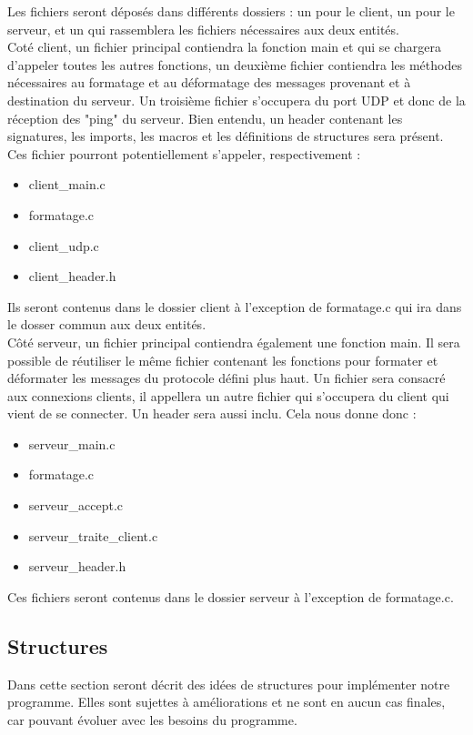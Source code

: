 \documentclass[12pt]{article}
\begin{document}
Les fichiers seront déposés dans différents dossiers : un pour le client, un pour le serveur, et un qui rassemblera les fichiers nécessaires aux deux entités.\\

Coté client, un fichier principal contiendra la fonction main et qui se chargera d'appeler toutes les autres fonctions, un deuxième fichier contiendra  les méthodes nécessaires au formatage et au déformatage des messages provenant et à destination du serveur. Un troisième fichier s'occupera du port UDP et donc de la réception des "ping" du serveur. Bien entendu, un header contenant les signatures, les imports, les macros et les définitions de structures sera présent.\\
Ces fichier pourront potentiellement s'appeler, respectivement :
\begin{itemize}
\item client\_main.c
\item formatage.c
\item client\_udp.c
\item client\_header.h
\end{itemize}
Ils seront contenus dans le dossier client à l'exception de formatage.c qui ira dans le dosser commun aux deux entités.\\

Côté serveur, un fichier principal contiendra également une fonction main. Il sera possible de réutiliser le même fichier contenant les fonctions pour formater et déformater les messages du protocole défini plus haut. Un fichier sera consacré aux connexions clients, il appellera un autre fichier qui s'occupera du client qui vient de se connecter. Un header sera aussi inclu.
Cela nous donne donc :
\begin{itemize}
\item serveur\_main.c
\item formatage.c
\item serveur\_accept.c
\item serveur\_traite\_client.c
\item serveur\_header.h
\end{itemize}
Ces fichiers seront contenus dans le dossier serveur à l'exception de formatage.c.

\subsection{Structures}
Dans cette section seront décrit des idées de structures pour implémenter notre programme. Elles sont sujettes à améliorations et ne sont en aucun cas finales, car pouvant évoluer avec les besoins du programme.\\
\end{document}
